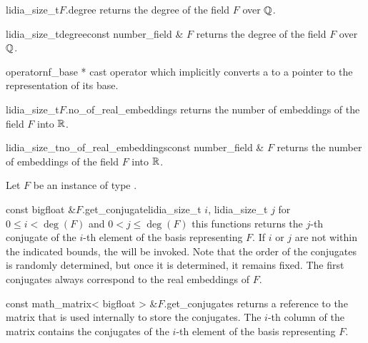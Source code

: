 \begin{cfcode}{lidia_size_t}{$F$.degree}{}
  returns the degree of the field $F$ over $\mathbb{Q}$.
\end{cfcode}

\begin{fcode}{lidia_size_t}{degree}{const number_field & $F$}
  returns the degree of the field $F$ over $\mathbb{Q}$.
\end{fcode}

\begin{cfcode}{operator}{nf_base *}{}
  cast operator which implicitly converts a  to a pointer to the
  representation of its base.
\end{cfcode}

\begin{cfcode}{lidia_size_t}{$F$.no_of_real_embeddings}{}
  returns the number of embeddings of the field $F$ into $\mathbb{R}$.
\end{cfcode}

\begin{fcode}{lidia_size_t}{no_of_real_embeddings}{const number_field & $F$}
  returns the number of embeddings of the field $F$ into $\mathbb{R}$.
\end{fcode}



\HIGH

Let $F$ be an instance of type .

\begin{cfcode}{const bigfloat &}{$F$.get_conjugate}{lidia_size_t $i$, lidia_size_t $j$}
  for $0 \leq i < \deg(F)$ and $0 < j \leq \deg(F)$ this functions returns the $j$-th conjugate
  of the $i$-th element of the basis representing $F$.  If $i$ or $j$ are not within the
  indicated bounds, the \LEH will be invoked.  Note that the order of the conjugates is randomly
  determined, but once it is determined, it remains fixed.  The first
   conjugates always correspond to the real embeddings of $F$.
\end{cfcode}

\begin{cfcode}{const math_matrix< bigfloat > &}{$F$.get_conjugates}{}
  returns a reference to the matrix that is used internally to store the conjugates.  The $i$-th
  column of the matrix contains the conjugates of the $i$-th element of the basis representing
  $F$.
\end{cfcode}


